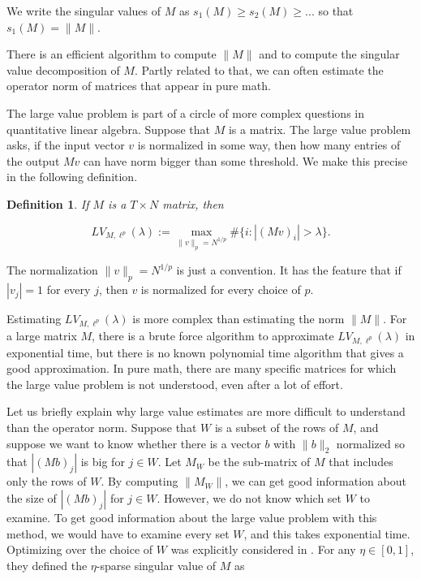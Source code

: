\documentclass{amsart}
\newtheorem{definition}{Definition}[section]
\begin{document}
\noindent We write the singular values of $M$ as $s_1(M) \ge s_2(M) \ge ... $ so that $s_1(M) = \| M \|$.  

There is an efficient algorithm to compute $\| M \|$ and to compute the singular value decomposition of $M$.   Partly related to that, we can often estimate the operator norm of matrices that appear in pure math.

The large value problem is part of a circle of more complex questions in quantitative linear algebra.  
Suppose that $M$ is a matrix.   The large value problem asks,  if the input vector $v$ is normalized in some way,  then how many entries of the output $Mv$ can have norm bigger than some threshold.   We make this precise in the following definition.

\begin{definition} \label{LVdef} If $M$ is a $T \times N$ matrix,  then 

$$ LV_{M,  \ell^p}(\lambda) := \max_{\| v \|_p = N^{1/p}} \# \{ i : | (Mv)_i | > \lambda \}. $$
\end{definition}

The normalization $\| v \|_p = N^{1/p}$ is just a convention.   It has the feature that if $|v_j| = 1$ for every $j$,  then $v$ is normalized for every choice of $p$.   

Estimating $LV_{M, \ell^p}(\lambda)$ is more complex than estimating the norm $\| M \|$.  For a large matrix $M$, there is a brute force algorithm to approximate $LV_{M, \ell^p}(\lambda)$ in exponential time, but there is no known polynomial time algorithm that gives a good approximation.  In pure math, there are many specific matrices for which the large value problem is not understood, even after a lot of effort.

Let us briefly explain why large value estimates are more difficult to understand than the operator norm.   Suppose that $W$ is a subset of the rows of $M$,  and suppose we want to know whether there is a vector $b$ with $\| b \|_2$ normalized so that $| (Mb)_j|$ is big for $j \in W$.    Let $M_W$ be the sub-matrix of $M$ that includes only the rows of $W$.    By computing $\| M_W \|$,  we can get good information about the size of $|(Mb)_j|$ for $j \in W$.   However,  we do not know which set $W$ to examine.   To get good information about the large value problem with this method,  we would have to examine every set $W$,  and this takes exponential time.   Optimizing over the choice of $W$ was explicitly considered in \cite{DHPT}.   For any $\eta \in [0,1]$,  they defined the $\eta$-sparse singular value of $M$ as
\end{document}
